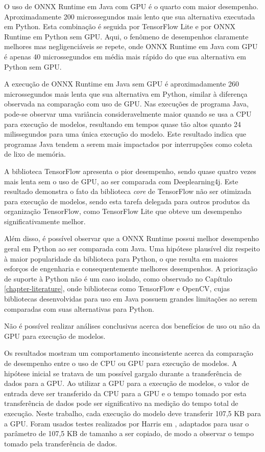 O uso de ONNX Runtime em Java com GPU é o quarto com maior desempenho. Aproximadamente 200 microssegundos mais lento que sua alternativa executada em Python. Esta combinação é seguida por TensorFlow Lite e por ONNX Runtime em Python sem GPU. Aqui, o fenômeno de desempenhos claramente melhores mas negligenciáveis se repete, onde ONNX Runtime em Java com GPU é apenas 40 microssegundos em média mais rápido do que sua alternativa em Python sem GPU.

A execução de ONNX Runtime em Java sem GPU é aproximadamente 260 microssegundos mais lenta que sua alternativa em Python, similar à diferença observada na comparação com uso de GPU. Nas execuções de programa Java, pode-se observar uma variância consideravelmente maior quando se usa a CPU para execução de modelos, resultando em tempos quase tão altos quanto 24 milissegundos para uma única execução do modelo. Este resultado indica que programas Java tendem a serem mais impactados por interrupções como coleta de lixo de memória.

A biblioteca TensorFlow apresenta o pior desempenho, sendo quase quatro vezes mais lenta sem o uso de GPU, ao ser comparada com Deeplearning4j. Este resultado demonstra o fato da biblioteca \textit{core} de TensorFlow não ser otimizada para execução de modelos, sendo esta tarefa delegada para outros produtos da organização TensorFlow, como TensorFlow Lite que obteve um desempenho significativamente melhor.

Além disso, é possível observar que a ONNX Runtime possui melhor desempenho geral em Python ao ser comparada com Java. Uma hipótese plausível diz respeito à maior popularidade da biblioteca para Python, o que resulta em maiores esforços de engenharia e consequentemente melhores desempenhos. A priorização de suporte à Python não é um caso isolado, como observado no Capítulo \ref{chapter-literature}, onde bibliotecas como TensorFlow e OpenCV, cujas bibliotecas desenvolvidas para uso em Java possuem grandes limitações ao serem comparadas com suas alternativas para Python.

Não é possível realizar análises conclusivas acerca dos benefícios de uso ou não da GPU para execução de modelos.

Os resultados mostram um comportamento inconsistente acerca da comparação de desempenho entre o uso de CPU ou GPU para execução de modelos. A hipótese inicial se tratava de um possível gargalo durante a transferência de dados para a GPU. Ao utilizar a GPU para a execução de modelos, o valor de entrada deve ser transferido da CPU para a GPU e o tempo tomado por esta transferência de dados pode ser significativo na medição do tempo total de execução. Neste trabalho, cada execução do modelo deve transferir 107,5 KB para a GPU. Foram usados testes realizados por Harris em \cite{harris_2012}, adaptados para usar o parâmetro de 107,5 KB de tamanho a ser copiado, de modo a observar o tempo tomado pela transferência de dados.

